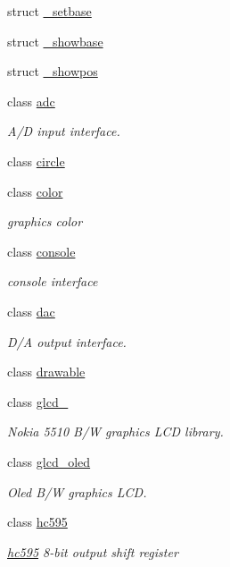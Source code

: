 \begin{DoxyCompactItemize}
\item 
struct \hyperlink{structhwlib_1_1__setbase}{\+\_\+setbase}
\item 
struct \hyperlink{structhwlib_1_1__showbase}{\+\_\+showbase}
\item 
struct \hyperlink{structhwlib_1_1__showpos}{\+\_\+showpos}
\item 
class \hyperlink{classhwlib_1_1adc}{adc}
\begin{DoxyCompactList}\small\item\em A/D input interface. \end{DoxyCompactList}\item 
class \hyperlink{classhwlib_1_1circle}{circle}
\item 
class \hyperlink{classhwlib_1_1color}{color}
\begin{DoxyCompactList}\small\item\em graphics color \end{DoxyCompactList}\item 
class \hyperlink{classhwlib_1_1console}{console}
\begin{DoxyCompactList}\small\item\em console interface \end{DoxyCompactList}\item 
class \hyperlink{classhwlib_1_1dac}{dac}
\begin{DoxyCompactList}\small\item\em D/A output interface. \end{DoxyCompactList}\item 
class \hyperlink{classhwlib_1_1drawable}{drawable}
\item 
class \hyperlink{classhwlib_1_1glcd__5510}{glcd\+\_}
\begin{DoxyCompactList}\small\item\em Nokia 5510 B/W graphics L\+CD library. \end{DoxyCompactList}\item 
class \hyperlink{classhwlib_1_1glcd__oled}{glcd\+\_\+oled}
\begin{DoxyCompactList}\small\item\em Oled B/W graphics L\+CD. \end{DoxyCompactList}\item 
class \hyperlink{classhwlib_1_1hc595}{hc595}
\begin{DoxyCompactList}\small\item\em \hyperlink{classhwlib_1_1hc595}{hc595} 8-\/bit output shift register \end{DoxyCompactList}\item 

\end{DoxyCompactItemize}
